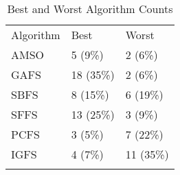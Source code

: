 \begin{table}
\caption{Best and Worst Algorithm Counts}
\label{tbl:best:worst:count}
\begin{tabular}{lll}
\noalign{\smallskip}\hline\noalign{\smallskip}
Algorithm&Best&Worst\\
\noalign{\smallskip}\hline
AMSO&5 (9\%)&2 (6\%)\\
GAFS&18 (35\%)&2 (6\%)\\
SBFS&8 (15\%)&6 (19\%)\\
SFFS&13 (25\%)&3 (9\%)\\
PCFS&3 (5\%)&7 (22\%)\\
IGFS&4 (7\%)&11 (35\%)\\
\noalign{\smallskip}\hline
\end{tabular}
\end{table}
